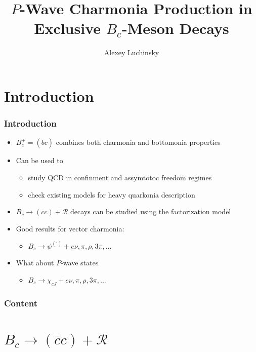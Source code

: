 \documentclass{beamer}
\title{$P$-Wave Charmonia Production in Exclusive $B_c$-Meson Decays}
\author{Alexey Luchinsky}
\institute{IHEP, Russia\\ BGSU, Bowling Green, OH, USA}
\newcommand{\R}{\mathcal{R}}
\newcommand{\cc}{(\bar{c}c)}
\begin{document}
\begin{frame}
  \maketitle
\end{frame}

\section{Introduction}
\begin{frame}
  \frametitle{Introduction}
  \begin{itemize}
  \item $B_c^+ = (\bar{b}c)$ combines both charmonia and bottomonia properties
  \item Can be used to
    \begin{itemize}
    \item study QCD in confinment and assymtotoc freedom regimes
    \item check existing models for heavy quarkonia description      
    \end{itemize}
  \item $B_c \to \cc+\R$ decays can be studied using the factorization model
  \item Good results for vector charmonia:
    \begin{itemize}
    \item $B_c \to \psi^{(')} + e\nu, \pi, \rho, 3\pi, \dots$
    \end{itemize}
  \item What about $P$-wave states
    \begin{itemize}
    \item $B_c \to \chi_{cJ} + e\nu, \pi, \rho, 3\pi, \dots$
    \end{itemize}

  \end{itemize}
\end{frame}


\begin{frame}
  \frametitle{Content}
  \tableofcontents
\end{frame}



\section{$B_c\to \cc + \R$}
\end{document}

